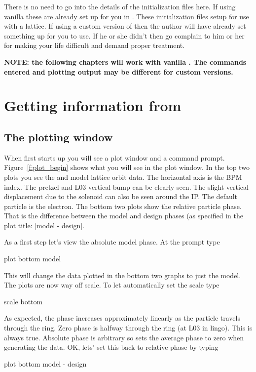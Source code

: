 \documentclass{report}
\begin{document}
There is no need to go into the details of the initialization files here. If
using vanilla \tao these are already set up for you in . These
initialization files setup \tao for use with a \cesr lattice. If
using a custom version of \tao then the author will have already set something
up for you to use. If he or she didn't then go complain to him or her for making
your life difficult and demand proper treatment.

\textbf{NOTE: the following chapters will work with vanilla \tao. The commands
entered and plotting output may be different for custom versions.}


\chapter{Getting information from \tao}
\label{c:get_info}

\section{The plotting window}

When \tao first starts up you will see a plot window and a command prompt. 
Figure~\ref{f:plot_begin} shows what you will see in the plot window. In the top
two plots you see the  and  model lattice orbit data. The horizontal
axis is the \cesr BPM index. The pretzel and L03 vertical bump can be clearly 
seen. The slight vertical displacement due to the solenoid can also be seen around 
the IP. The default particle is the electron. The bottom two plots show the relative 
particle phase. That is the difference
between the model and design phases (as specified in the plot title: [model -
design]. 

As a first step let's view the absolute model phase. At the  prompt type
\begin{example}
  plot bottom model
\end{example}
This will change the data plotted in the bottom two graphs to just the model.
The plots are now way off scale. To let \tao automatically set the scale type
\begin{example}
  scale bottom
\end{example}
As expected, the phase increases approximately linearly as the particle travels
through the ring. Zero phase is halfway through the ring (at L03 in \cesr lingo).
This is always true. Absolute phase is arbitrary so \tao sets the average
phase to zero when generating the data. OK, lets' set this back to relative
phase by typing
\begin{example}
  plot bottom model - design
\end{example}
\end{document}
